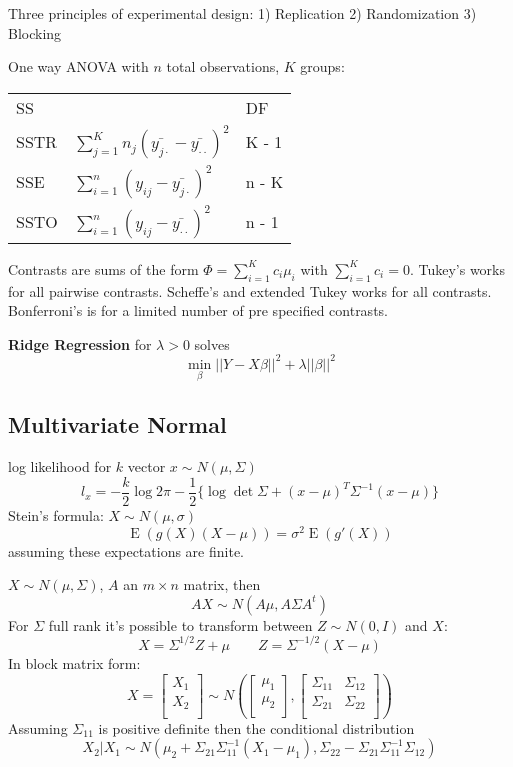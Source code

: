 \documentclass[10pt, twocolumn]{article}
\newcommand{\Expect}{\operatorname{E}}
\begin{document}
Three principles of experimental design: 1) Replication 2) Randomization 3)
Blocking

One way ANOVA with $n$ total observations, $K$ groups:

{
\centering
\begin{tabular}{lll}
    SS   &  & DF     \\
    SSTR & $\sum_{j=1}^K n_j (\bar{y_{j \cdot}} - \bar{y_{\cdot \cdot}})^2$  & K - 1 \\
    SSE  & $\sum_{i=1}^n (y_{ij} - \bar{y_{j \cdot}})^2$  & n - K \\
    SSTO & $\sum_{i=1}^n (y_{ij} - \bar{y_{\cdot \cdot}})^2$  & n - 1 
\end{tabular}
}

Contrasts are sums of the form $\Phi = \sum_{i=1}^K c_i \mu_i$ with
$\sum_{i=1}^K c_i = 0$.
Tukey's works for all pairwise contrasts.
Scheffe's and extended Tukey works for all contrasts.
Bonferroni's is for a limited number of pre specified contrasts.

\textbf{Ridge Regression} for $\lambda > 0$ solves
\[
    \min_\beta ||Y - X\beta||^2 + \lambda ||\beta||^2
\]

\newpage

\subsection*{Multivariate Normal}

log likelihood for $k$ vector $x \sim N(\mu, \Sigma)$
\[
    l_x = -\frac{k}{2} \log 2 \pi - \frac{1}{2}
    \{ \log \det \Sigma + (x - \mu)^T \Sigma^{-1} (x - \mu) \}
\]
Stein's formula: $X \sim N(\mu, \sigma)$
\[
    \Expect (g(X) (X - \mu)) = \sigma^2 \Expect(g'(X))
\]
assuming these expectations are finite.

$X \sim N(\mu, \Sigma)$, $A$ an $m \times n$ matrix,
then 
\[
    AX \sim N(A \mu, A \Sigma A^t)
\]
For $\Sigma$ full rank it's possible to transform between $Z \sim
N(0, I)$ and $X$:
\[
    X = \Sigma^{1/2} Z + \mu \qquad Z = \Sigma^{-1/2} (X - \mu)
\]
In block matrix form:
\[
    X =
    \begin{bmatrix}
        X_1 \\
        X_2 \\
    \end{bmatrix}
    \sim N \left(
    \begin{bmatrix}
        \mu_1 \\
        \mu_2 \\
    \end{bmatrix}
    ,
    \begin{bmatrix}
        \Sigma_{11} & \Sigma_{12} \\
        \Sigma_{21} & \Sigma_{22} \\
    \end{bmatrix}
\right)
\]
Assuming $\Sigma_{11}$ is positive definite then the conditional
distribution
\[
    X_2 | X_1 \sim N(\mu_2 + \Sigma_{21} \Sigma_{11}^{-1} (X_1 - \mu_1),
    \Sigma_{22} - \Sigma_{21} \Sigma_{11}^{-1} \Sigma_{12})
\]
\end{document}
